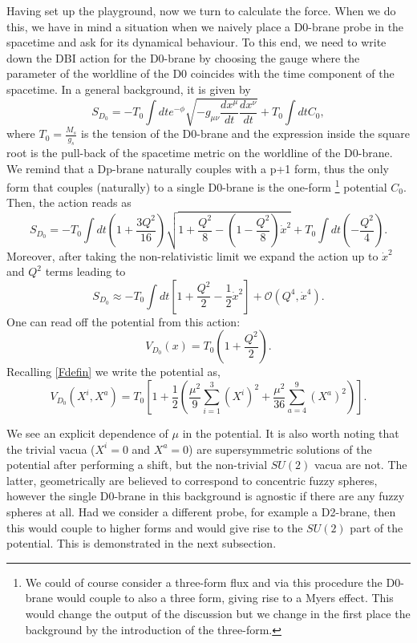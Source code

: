 \documentclass[11pt,english]{article}
\newcommand{\be}{\begin{equation}}
\newcommand{\ee}{\end{equation}}
\numberwithin{equation}{section}
\begin{document}
Having set up the playground, now we turn to calculate the force. When we do this, we have in mind a situation when we naively place a D0-brane probe in the spacetime and ask for its dynamical behaviour. To this end, we need to write down the DBI action for the D0-brane by choosing the gauge where the parameter of the worldline of the D0 coincides with the time component of the spacetime. In a general background, it is given by 
\be\label{bosonicpart}
S_{D_0}=-T_0\int dt e^{-\phi}\sqrt{-g_{\mu\nu}\frac{dx^\mu }{dt}\frac{dx^\nu}{dt}}+T_0\int dt C_0,
\ee
where $T_0=\frac{M_s}{g_s}$ is the tension of the D0-brane and the expression inside the square root is the pull-back of the spacetime metric on the worldline of the D0-brane. We remind that a Dp-brane naturally couples with a p+1 form, thus the only form that couples (naturally) to a single D0-brane is the one-form \footnote{We could of course consider a three-form flux and via this procedure the D0-brane would couple to also a three form, giving rise to a Myers effect. This would change the output of the discussion but we change in the first place the background by the introduction of the three-form.} potential $C_0$.  Then, the action reads as 
\be 
S_{D_0}=-T_0\int dt \left(1+\frac{3Q^2}{16}\right)\sqrt{1+\frac{Q^2}{8}-\left(1-\frac{Q^2}{8}\right)\dot{x}^2}+T_0\int dt \left(-\frac{Q^2}{4}\right).
\ee
Moreover, after taking the non-relativistic limit we expand the action up to $\dot{x}^2$ and $Q^2$ terms leading to
\be 
S_{D_0}\approx-T_0\int dt\left[1+\frac{Q^2}{2}-\frac{1}{2}\dot{x}^2\right] +\mathcal{O}(Q^4,\dot{x}^4).
\ee
One can read off the potential from this action:
\be \label{potential1}
V_{D_0}(x)=T_0(1+\frac{Q^2}{2}).
\ee
Recalling \eqref{Fdefin} we write the potential as, 
\be 
V_{D_0}(X^i,X^a)=T_0\left[1+\frac{1}{2}\left(\frac{\mu^2}{9}\sum_{i=1}^3(X^i)^2+\frac{\mu^2}{36}\sum_{a=4}^9(X^a)^2\right)\right].
\ee

\noindent
We see an explicit dependence of $\mu$ in the potential. It is also worth noting that the trivial vacua ($X^i=0$ and $X^a=0$) are supersymmetric solutions of the potential after performing a shift, but the non-trivial $SU(2)$ vacua are not. The latter, geometrically are believed to correspond to concentric fuzzy spheres, however the single D0-brane in this background is agnostic if there are any fuzzy spheres at all. Had we consider a different probe, for example a D2-brane, then this would couple to higher forms and would give rise to the $SU(2)$ part of the potential. This is demonstrated in the next subsection. 
\end{document}
